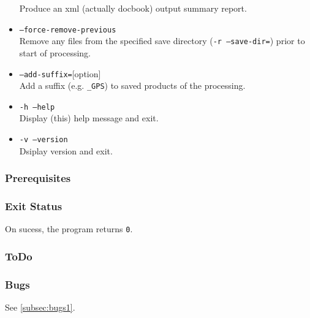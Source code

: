 \begin{itemize}
Produce an xml (actually docbook) output summary report.
\item \texttt{--force-remove-previous}\\
Remove any files from the specified save directory (\texttt{-r --save-dir=}) prior to start 
of processing.
\item \texttt{--add-suffix=}[option]\\
Add a suffix (e.g. \texttt{\_GPS}) to saved products of the processing.
\item \texttt{-h --help}\\
Display (this) help message and exit.
\item \texttt{-v --version}\\
Dsiplay version and exit.
\end{itemize}


\subsubsection{Prerequisites}


\subsubsection{Exit Status}
On sucess, the program returns \texttt{0}.

\subsubsection{ToDo}

\subsubsection{Bugs}
See \autoref{subsec:bugs1}.
\bigskip

